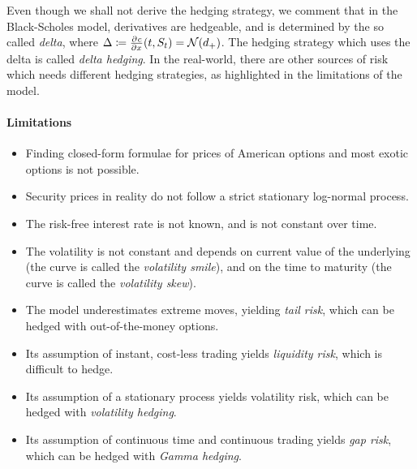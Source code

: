 \begin{rem}[Hedging]
	Even though we shall not derive the hedging strategy, we comment that in the Black-Scholes model, derivatives are hedgeable, and is determined by the so called \emph{delta}, where $ \Delta \coloneqq \pd{c}{x}(t,S_t) = \mathcal{N}(d_+) $. The hedging strategy which uses the delta is called \emph{delta hedging}. In the real-world, there are other sources of risk which needs different hedging strategies, as highlighted in the limitations of the model.
\end{rem}


\paragraph{Limitations}
\begin{itemize}
	\item Finding closed-form formulae for prices of American options and most exotic options is not possible.
	\item Security prices in reality do not follow a strict stationary log-normal process.
	\item The risk-free interest rate is not known, and is not constant over time.
	\item The volatility is not constant and depends on current value of the underlying (the curve is called the \emph{volatility smile}), and on the time to maturity (the curve is called the \emph{volatility skew}).
	\item The model underestimates extreme moves, yielding \emph{tail risk}, which can be hedged with out-of-the-money options.
	\item Its assumption of instant, cost-less trading yields \emph{liquidity risk}, which is difficult to hedge.
	\item Its assumption of a stationary process yields volatility risk, which can be hedged with \emph{volatility hedging}.
	\item Its assumption of continuous time and continuous trading yields \emph{gap risk}, which can be hedged with \emph{Gamma hedging}.
\end{itemize}


